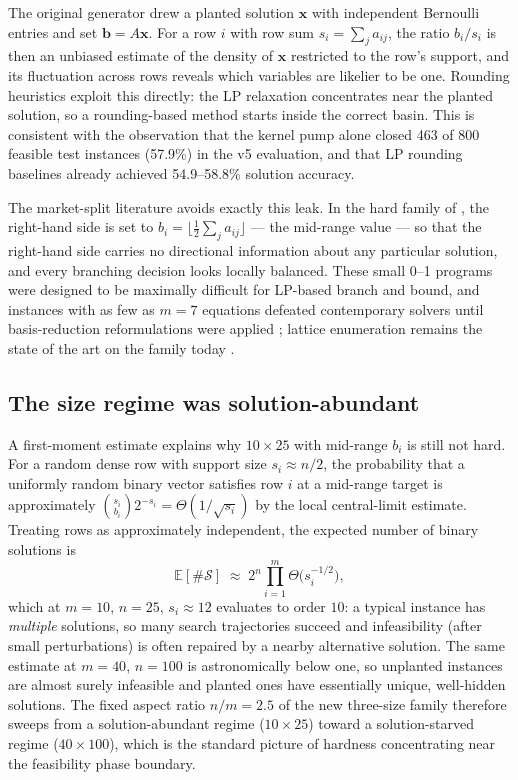 \documentclass[12pt]{article}
\begin{document}
The original generator drew a planted solution $\mathbf{x}$ with independent Bernoulli entries and set $\mathbf{b} = A\mathbf{x}$. For a row $i$ with row sum $s_i = \sum_j a_{ij}$, the ratio $b_i / s_i$ is then an unbiased estimate of the density of $\mathbf{x}$ restricted to the row's support, and its fluctuation across rows reveals which variables are likelier to be one. Rounding heuristics exploit this directly: the LP relaxation concentrates near the planted solution, so a rounding-based method starts inside the correct basin. This is consistent with the observation that the kernel pump alone closed 463 of 800 feasible test instances (57.9\%) in the v5 evaluation, and that LP rounding baselines already achieved 54.9--58.8\% solution accuracy.

The market-split literature avoids exactly this leak. In the hard family of \citet{cornuejols1998market}, the right-hand side is set to $b_i = \lfloor \frac{1}{2}\sum_j a_{ij} \rfloor$ --- the mid-range value --- so that the right-hand side carries no directional information about any particular solution, and every branching decision looks locally balanced. These small 0--1 programs were designed to be maximally difficult for LP-based branch and bound, and instances with as few as $m = 7$ equations defeated contemporary solvers until basis-reduction reformulations were applied \citep{aardal2000market}; lattice enumeration remains the state of the art on the family today \citep{wassermann2025market}.

\subsection{The size regime was solution-abundant}

A first-moment estimate explains why $10 \times 25$ with mid-range $b_i$ is still not hard. For a random dense row with support size $s_i \approx n/2$, the probability that a uniformly random binary vector satisfies row $i$ at a mid-range target is approximately $\binom{s_i}{b_i} 2^{-s_i} = \Theta(1/\sqrt{s_i})$ by the local central-limit estimate. Treating rows as approximately independent, the expected number of binary solutions is
\[
\mathbb{E}[\#\mathcal{S}] \;\approx\; 2^{n} \prod_{i=1}^{m} \Theta\!\big(s_i^{-1/2}\big),
\]
which at $m{=}10$, $n{=}25$, $s_i \approx 12$ evaluates to order $10$: a typical instance has \emph{multiple} solutions, so many search trajectories succeed and infeasibility (after small perturbations) is often repaired by a nearby alternative solution. The same estimate at $m{=}40$, $n{=}100$ is astronomically below one, so unplanted instances are almost surely infeasible and planted ones have essentially unique, well-hidden solutions. The fixed aspect ratio $n/m = 2.5$ of the new three-size family therefore sweeps from a solution-abundant regime ($10 \times 25$) toward a solution-starved regime ($40 \times 100$), which is the standard picture of hardness concentrating near the feasibility phase boundary.
\end{document}

